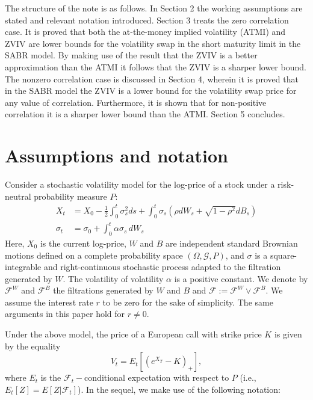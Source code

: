 \documentclass[11pt]{article}
\begin{document}
\smallskip
The structure of the note is as follows. In Section 2 the working assumptions are stated and relevant notation introduced. Section 3 treats the zero correlation case. It is proved that both the at-the-money implied volatility (ATMI) and ZVIV are lower bounds for the volatility swap in the short maturity limit in the SABR model. By making use of the result that the ZVIV is a better approximation than the ATMI it follows that the ZVIV is a sharper lower bound. The nonzero correlation case is discussed in Section 4, wherein it is proved that in the SABR model the ZVIV is a lower bound for the volatility swap price for any value of correlation. Furthermore, it is shown that for non-positive correlation it is a sharper lower bound than the ATMI. Section 5 concludes.



\section{Assumptions and notation}

Consider a stochastic volatility model for the log-price of a stock
under a risk-neutral probability measure $P$:
\begin{align}
\label{themodel}
X_{t} &=X_0-\frac{1}{2}\int_{0}^{t}{\sigma _{s}^{2}}ds+\int_{0}^{t}\sigma
_{s}\left( \rho dW_{s}+\sqrt{1-\rho ^{2}}dB_{s}\right) \\
\label{SABR}
\sigma_t &= \sigma_0 + \int_0^t \alpha \sigma_s \, dW_s
\end{align}
Here, $X_0$ is the current log-price, $%
W$ and $B$ are independent standard Brownian motions defined on a complete probability
space  $(\Omega ,\mathcal{G},P)$, and $\sigma $ is a square-integrable and
right-continuous stochastic process adapted to the filtration generated by $%
W $.  The volatility of volatility $\alpha$ is a positive constant. We denote by $\mathcal{F}^{W}$ and $\mathcal{F}^{B}$
the filtrations generated by $W$ and $B$ and $\mathcal{F}:=%
\mathcal{F}^{W}\vee \mathcal{F}^{B}.$ We assume the interest rate $r$ to be zero for the sake of simplicity. The same arguments in this paper hold for $r\neq 0$.


Under the above model, the price of a European call with strike price $K$ is given by the equality
\[
V_{t}=E_{t}[(e^{X_{T}}-K)_{+}], 
\]%
where $E_{t}$ is the $\mathcal{F}_{t}-$conditional expectation with respect
to $P$ (i.e., $E_{t}[Z]=E[Z|\mathcal{F}_{t}]$). In the sequel, we make use
of the following notation:
\end{document}
